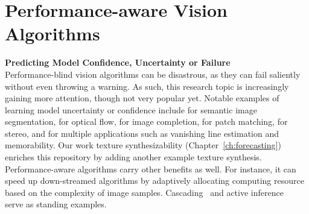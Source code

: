 \section{Performance-aware Vision Algorithms}
\textbf{Predicting Model Confidence, Uncertainty or Failure}  \\
Performance-blind vision algorithms can be disastrous, as they can fail saliently without even throwing a warning. 
As such, this research topic is increasingly gaining more attention, though not very popular yet. Notable examples of learning model uncertainty or confidence include      
\citep{kendall2015bayesian} for semantic image segmentation, \citep{confidence:of:08, flow:confidence}  for  optical flow,  \citep{completion:quality} for image completion,  \citep{matchability} for patch matching, \citep{stereo:confidence} for stereo, and \citep{zhang2014predicting} for multiple applications such as vanishing line estimation and memorability.  Our work texture synthesizability (Chapter~\ref{ch:forecasting}) enriches this repository by adding another example texture synthesis. 
Performance-aware algorithms carry other benefits as well. For instance, it can speed up down-streamed algorithms by adaptively allocating computing resource based on the complexity of image samples.  Cascading~\citep{cascaded:01, felzenszwalb2010cascade} and active inference~\citep{liu2015multiclass} serve as standing examples. 

%   

